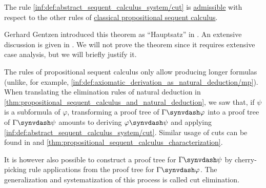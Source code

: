\begin{theorem}\label{thm:cut_elimination}
  The rule \ref{inf:def:abstract_sequent_calculus_system/cut} is \hyperref[con:inference_rule_admissibility]{admissible} with respect to the other rules of \hyperref[def:classical_propositional_sequent_calculus]{classical propositional sequent calculus}.
\end{theorem}
\begin{comments}
  \item Gerhard Gentzen introduced this theorem as \enquote{Hauptsatz} in \cite{Gentzen1935LogischeSchließen}. An extensive discussion is given in \cite[ch. 4]{TroelstraSchwichtenberg2000BasicProofTheory}. We will not prove the theorem since it requires extensive case analysis, but we will briefly justify it.

  The rules of propositional sequent calculus only allow producing longer formulas (unlike, for example, \ref{inf:def:axiomatic_derivation_as_natural_deduction/mp}). When translating the elimination rules of natural deduction in \cref{thm:propositional_sequent_calculus_and_natural_deduction}, we saw that, if \( \psi \) is a subformula of \( \varphi \), transforming a proof tree of \( \Gamma \synvdash \varphi \) into a proof tree of \( \Gamma \synvdash \psi \) amounts to deriving \( \varphi \synvdash \psi \) and applying \ref{inf:def:abstract_sequent_calculus_system/cut}. Similar usage of cuts can be found in  and \cref{thm:propositional_sequent_calculus_characterization}.

  It is however also possible to construct a proof tree for \( \Gamma \synvdash \psi \) by cherry-picking rule applications from the proof tree for \( \Gamma \synvdash \varphi \). The generalization and systematization of this process is called cut elimination.
\end{comments}
